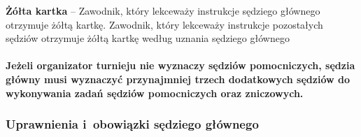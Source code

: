 \documentclass[12pt]{article}
\newcommand\yellowcard[1]{\bgroup\textcolor{darkyellow}{\textbf{#1}}}
\begin{document}
\yellowcard{Żółta kartka} -- Zawodnik, który lekceważy instrukcje sędziego
głównego otrzymuje żółtą kartkę. Zawodnik, który lekceważy instrukcje
pozostałych sędziów otrzymuje żółtą kartkę według uznania sędziego
głównego

\paragraph{Jeżeli organizator turnieju nie wyznaczy sędziów
	pomocniczych, sędzia główny musi wyznaczyć przynajmniej trzech
	dodatkowych sędziów do wykonywania zadań sędziów pomocniczych oraz
	zniczowych.}

\subsubsection{Uprawnienia i~obowiązki sędziego głównego}
\end{document}
